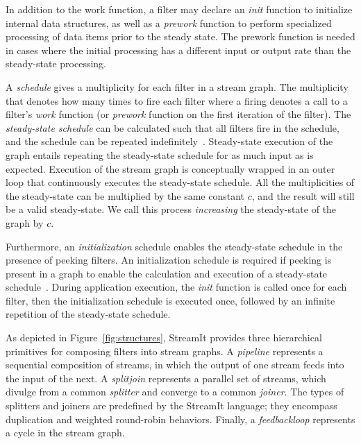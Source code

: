 In addition to the work function, a filter may declare an {\it init}
function to initialize internal data structures, as well as a {\it
  prework} function to perform specialized processing of data items
prior to the steady state.  The prework function is needed in cases
where the initial processing has a different input or output rate than
the steady-state processing.

A {\it schedule} gives a multiplicity for each filter in a stream
graph.  The multiplicity that denotes how many times to fire each
filter where a firing denotes a call to a filter's {\it work} function
(or {\it prework} function on the first iteration of the filter).  The
{\it steady-state schedule} can be calculated such that all filters
fire in the schedule, and the schedule can be repeated
indefinitely~\cite{lee87}.  Steady-state execution of the graph
entails repeating the steady-state schedule for as much input as is
expected.  Execution of the stream graph is conceptually wrapped in an
outer loop that continuously executes the steady-state schedule.  All
the multiplicities of the steady-state can be multiplied by the same
constant $c$, and the result will still be a valid steady-state.  We
call this process {\it increasing} the steady-state of the graph by
$c$.

Furthermore, an {\it initialization} schedule enables the steady-state
schedule in the presence of peeking filters.  An initialization
schedule is required if peeking is present in a graph to enable the
calculation and execution of a steady-state
schedule~\cite{karczmarek-lctes03}.  During application execution, the
{\it init} function is called once for each filter, then the
initialization schedule is executed once, followed by an infinite
repetition of the steady-state schedule.

As depicted in Figure~\ref{fig:structures}, StreamIt provides three
hierarchical primitives for composing filters into stream graphs.  A
{\it pipeline} represents a sequential composition of streams, in
which the output of one stream feeds into the input of the next.  A
{\it splitjoin} represents a parallel set of streams, which divulge
from a common {\it splitter} and converge to a common {\it joiner}.
The types of splitters and joiners are predefined by the StreamIt
language; they encompass duplication and weighted round-robin
behaviors.  Finally, a {\it feedbackloop} represents a cycle in the
stream graph.


